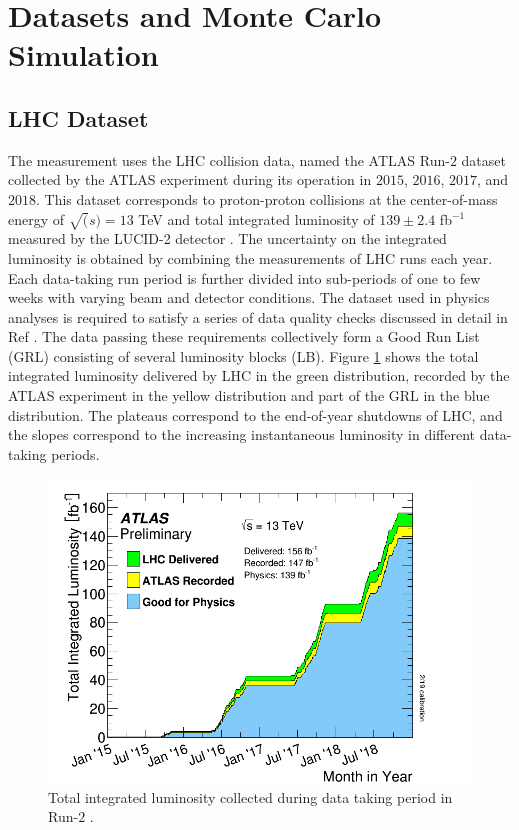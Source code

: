 \section{Datasets and Monte Carlo Simulation}
\label{sec:DataSetAndMonteCarlo}

\subsection{LHC Dataset}
\label{subsec:Dataset}

The measurement uses the LHC collision data, named the ATLAS Run-$2$ dataset collected by the ATLAS experiment during its operation in $2015$, $2016$, $2017$, and $2018$. This dataset corresponds to proton-proton collisions at the center-of-mass energy of $\sqrt(s) = 13$ TeV and total integrated luminosity of $139 \pm 2.4$ fb$^{-1}$ measured by the LUCID-2 detector \cite{ATLASLuminosityDetector}\cite{ATLASRun2IntegratedLumi}. The uncertainty on the integrated luminosity is obtained by combining the measurements of LHC runs each year. Each data-taking run period is further divided into sub-periods of one to few weeks with varying beam and detector conditions. The dataset used in physics analyses is required to satisfy a series of data quality checks discussed in detail in Ref \cite{ATLASRun2DataTaking}. The data passing these requirements collectively form a Good Run List (GRL) consisting of several luminosity blocks (LB). Figure \ref{fig:InstLuminosity} shows the total integrated luminosity delivered by LHC in the green distribution, recorded by the ATLAS experiment in the yellow distribution and part of the GRL in the blue distribution. The plateaus correspond to the end-of-year shutdowns of LHC, and the slopes correspond to the increasing instantaneous luminosity in different data-taking periods. 

\begin{figure}
\centering
\includegraphics[width=.8\linewidth]{figures/AnalysisOverview/IntegratedLumiRun2.pdf}  
  \caption{Total integrated luminosity collected during data taking period in Run-$2$ \cite{ATLASRun2DataTaking}. }
\label{fig:InstLuminosity}
\end{figure}

